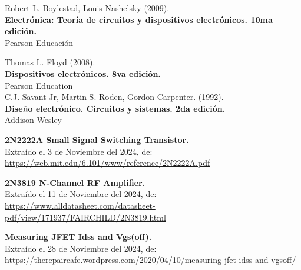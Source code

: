 \documentclass[letter,twoside,11pt]{report}
\begin{document}
\begin{thebibliography}{99}

Robert L. Boylestad, Louis Nashelsky (2009).\\
\textbf{Electrónica: Teoría de circuitos y dispositivos electrónicos. 10ma edición.}\\
Pearson Educación

Thomas L. Floyd (2008).\\
\textbf{Dispositivos electrónicos. 8va edición.}\\
Pearson Education\\

C.J. Savant Jr, Martin S. Roden, Gordon Carpenter. (1992).\\
\textbf{Diseño electrónico. Circuitos y sistemas. 2da edición.}\\
Addison-Wesley

\textbf{2N2222A Small Signal Switching Transistor.}\\
Extraído el 3 de Noviembre del 2024, de: \\
\url{https://web.mit.edu/6.101/www/reference/2N2222A.pdf}

\textbf{2N3819 N-Channel RF Amplifier.}\\
Extraído el 11 de Noviembre del 2024, de: \\
\url{https://www.alldatasheet.com/datasheet-pdf/view/171937/FAIRCHILD/2N3819.html}

\textbf{Measuring JFET Idss and Vgs(off).}\\
Extraído el 28 de Noviembre del 2024, de: \\
\url{https://therepaircafe.wordpress.com/2020/04/10/measuring-jfet-idss-and-vgsoff/}

\end{thebibliography}
\end{document}
